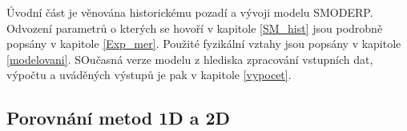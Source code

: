 %

Úvodní část je věnována historickému pozadí a vývoji modelu SMODERP. Odvození parametrů o kterých se hovoří v kapitole \ref{SM_hist} jsou podrobně popsány v kapitole \ref{Exp_mer}. Použité fyzikální vztahy jsou popsány v kapitole \ref{modelovani}. SOučasná verze modelu z hlediska zpracování vstupních dat, výpočtu a uváděných výstupů je pak v kapitole \ref{vypocet}.

\subsection{Porovnání metod 1D a 2D} \label{porovnani1D2D}


